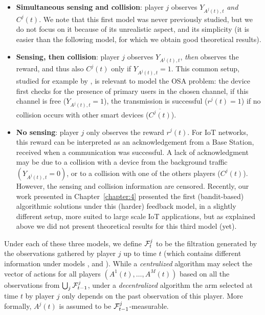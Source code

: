 \begin{itemize}
  \item[\modelun]
    \textbf{Simultaneous sensing and collision}: player $j$ observes  $Y_{A^j(t),t}$ \emph{and} $C^j(t)$.
    We note that this first model was never previously studied, but we do not focus on it because of its unrealistic aspect, and its simplicity (it is easier than the following model, for which we obtain good theoretical results).
  \item[\modeldeux]
    \textbf{Sensing, then collision}: player $j$ observes $Y_{A^j(t),t}$, \emph{then} observes the reward, and thus also $C^j(t)$ only if $Y_{A^j(t),t} = 1$.
    This common setup, studied for example by \cite{Anandkumar11,Rosenski16}, is relevant to model the OSA problem: the device first checks for the presence of primary users in the chosen channel,
    if this channel is free ($Y_{A^j(t),t}=1$), the transmission is successful ($r^j(t)=1$) if no collision occurs with other smart devices ($\overline{C^j(t)}$).
  \item[\modeltrois]
    \textbf{No sensing}: player $j$ only observes the reward $r^j(t)$.
    For IoT networks, this reward can be interpreted as an acknowledgement from a Base Station,
    received when a communication was successful.
    A lack of acknowledgment may be due to a collision
    with a device from the background traffic $(Y_{A^j(t),t}=0)$,
    or to a collision with one of the others players ($C^j(t)$).
    However, the sensing and collision information are censored.
    Recently, our work presented in Chapter~\ref{chapter:4} \cite{Bonnefoi17} presented the first (bandit-based) algorithmic solutions under this (harder) feedback model, in a slightly different setup, more suited to large scale IoT applications, but as explained above we did not present theoretical results for this third model (yet).
\end{itemize}

Under each of these three models, we define $\mathcal{F}^j_t$ to be the filtration generated by the observations gathered by player $j$ up to time $t$ (which contains different information under models \modelun, \modeldeux{} and \modeltrois).
While a \emph{centralized} algorithm may select the vector of actions for all players $(A^1(t),\dots,A^M(t))$ based on all the observations from $\bigcup_j \mathcal{F}^j_{t-1}$, under a \emph{decentralized} algorithm the arm selected at time $t$ by player $j$ only depends on the past observation of this player.
More formally, $A^j(t)$ is assumed to be $\mathcal{F}^j_{t-1}$-measurable.

